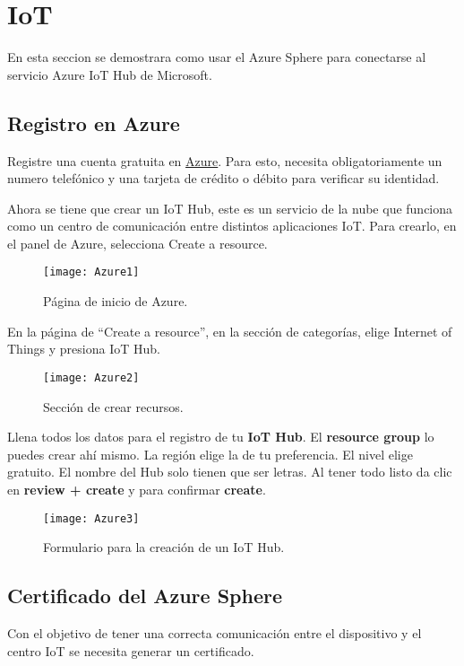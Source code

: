 \section{IoT}
En esta seccion se demostrara como usar el Azure Sphere para conectarse al servicio Azure IoT Hub de Microsoft.
\subsection{Registro en Azure}
Registre una cuenta gratuita en \href{https://azure.microsoft.com/es-mx/free}{Azure}. Para esto,	 necesita obligatoriamente un numero telefónico y una tarjeta de crédito o débito para verificar su identidad.

Ahora se tiene que crear un IoT Hub, este es un servicio de la nube que funciona como un centro de comunicación entre distintos aplicaciones IoT. Para crearlo, en el panel de Azure, selecciona Create a resource.
\begin{figure}[h]
	\centering
	\texttt{[image: Azure1]}
	\caption{Página de inicio de Azure.}
\end{figure}

En la página de ``Create a resource'', en la sección de categorías, elige Internet of Things y presiona IoT Hub.
\begin{figure}[h]
	\centering
	\texttt{[image: Azure2]}
	\caption{Sección de crear recursos.}
\end{figure}

Llena todos los datos para el registro de tu \textbf{IoT Hub}. El \textbf{resource group} lo puedes crear ahí mismo. La región elige la de tu preferencia. El nivel elige gratuito. El nombre del Hub solo tienen que ser letras. Al tener todo listo da clic en \textbf{review + create} y para confirmar \textbf{create}.
\begin{figure}[h]
	\centering
	\texttt{[image: Azure3]}
	\caption{Formulario para la creación de un IoT Hub.}
\end{figure}

\subsection{Certificado del Azure Sphere}
Con el objetivo de tener una correcta comunicación entre el dispositivo y el centro IoT se necesita generar un certificado.

